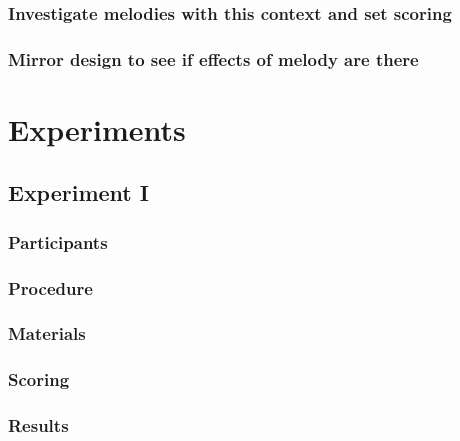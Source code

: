 \documentclass[]{book}
\begin{document}
\hypertarget{investigate-melodies-with-this-context-and-set-scoring}{%
\subsubsection{Investigate melodies with this context and set scoring}\label{investigate-melodies-with-this-context-and-set-scoring}}

\hypertarget{mirror-design-to-see-if-effects-of-melody-are-there}{%
\subsubsection{Mirror design to see if effects of melody are there}\label{mirror-design-to-see-if-effects-of-melody-are-there}}

\hypertarget{experiments-1}{%
\section{Experiments}\label{experiments-1}}

\hypertarget{experiment-i}{%
\subsection{Experiment I}\label{experiment-i}}

\hypertarget{participants-1}{%
\subsubsection{Participants}\label{participants-1}}

\hypertarget{procedure-1}{%
\subsubsection{Procedure}\label{procedure-1}}

\hypertarget{materials-1}{%
\subsubsection{Materials}\label{materials-1}}

\hypertarget{scoring}{%
\subsubsection{Scoring}\label{scoring}}

\hypertarget{results-1}{%
\subsubsection{Results}\label{results-1}}
\end{document}
